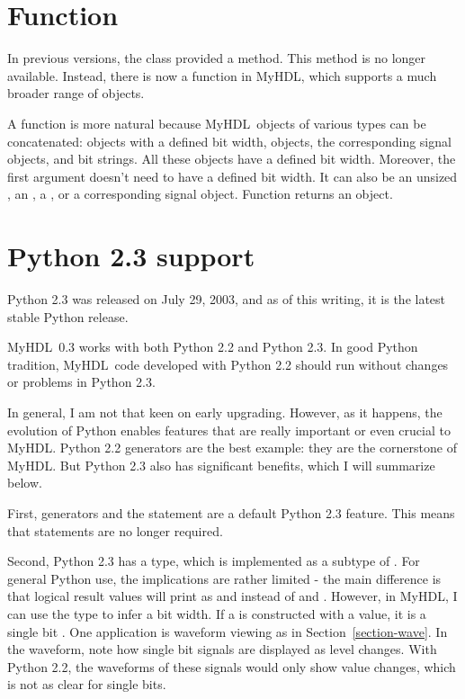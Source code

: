 \documentclass{howto}
\newcommand{\myhdl}{\protect \mbox{MyHDL}}
\begin{document}
\section{Function  \label{section-concat}}

In previous versions, the  class provided a
 method.  This method is no longer
available. Instead, there is now a  function in
\myhdl{}, which supports a much broader range of objects.

A function is more natural because \myhdl\ objects of various types
can be concatenated:  objects with a defined bit width,
 objects, the corresponding signal objects, and bit
strings. All these objects have a defined bit width.  Moreover, the
first argument doesn't need to have a defined bit width. It can also be
an unsized , an , a , or a
corresponding signal object.  Function  returns an
 object.


\section{Python 2.3 support\label{section-Python}}

Python 2.3 was released on July 29, 2003, and as of this writing, it
is the latest stable Python release.

\myhdl\ 0.3 works with both Python 2.2 and Python 2.3. In good Python
tradition, \myhdl\ code developed with Python 2.2 should run without
changes or problems in Python 2.3.

In general, I am not that keen on early upgrading. However, as it
happens, the evolution of Python enables features that are really
important or even crucial to \myhdl{}.  Python 2.2 generators are the
best example: they are the cornerstone of \myhdl{}. But Python 2.3
also has significant benefits, which I will summarize below.

First, generators and the  statement are a default Python
2.3 feature. This means that 
statements are no longer required.

Second, Python 2.3 has a  type, which is implemented as a
subtype of . For general Python use, the implications are
rather limited - the main difference is that logical result values
will print as  and  instead of  and
. However, in \myhdl{}, I can use the  type to
infer a bit width.  If a  is constructed with a
 value, it is a single bit . One application
is waveform viewing as in Section~\ref{section-wave}. In the waveform,
note how single bit signals are displayed as level changes.  With
Python 2.2, the waveforms of these signals would only show value
changes, which is not as clear for single bits.
\end{document}
